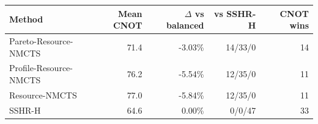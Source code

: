 \begin{tabular}{lrrrr}
\toprule
Method & Mean CNOT & $\Delta$ vs balanced & vs SSHR-H & CNOT wins \\
\midrule
Pareto-Resource-NMCTS & 71.4 & -3.03\% & 14/33/0 & 14 \\
Profile-Resource-NMCTS & 76.2 & -5.54\% & 12/35/0 & 11 \\
Resource-NMCTS & 77.0 & -5.84\% & 12/35/0 & 11 \\
SSHR-H & 64.6 & 0.00\% & 0/0/47 & 33 \\
\bottomrule
\end{tabular}
